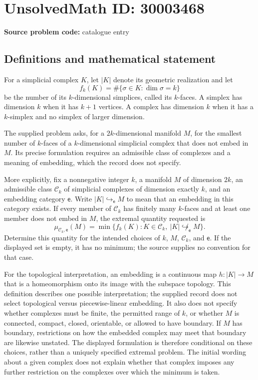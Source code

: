 \documentclass[11pt]{article}
\begin{document}
\section*{UnsolvedMath ID: 30003468}
\textbf{Source problem code:} catalogue entry
\subsection{Definitions and mathematical statement}
For a simplicial complex \(K\), let \(|K|\) denote its geometric realization and let
\[
f_k(K)=\#\{\sigma\in K:\dim\sigma=k\}
\]
be the number of its \(k\)-dimensional simplices, called its \(k\)-faces. A simplex has dimension \(k\) when it has \(k+1\) vertices. A complex has dimension \(k\) when it has a \(k\)-simplex and no simplex of larger dimension.

The supplied problem asks, for a \(2k\)-dimensional manifold \(M\), for the smallest number of \(k\)-faces of a \(k\)-dimensional simplicial complex that does not embed in \(M\). Its precise formulation requires an admissible class of complexes and a meaning of embedding, which the record does not specify.

More explicitly, fix a nonnegative integer \(k\), a manifold \(M\) of dimension \(2k\), an admissible class \(\mathcal C_k\) of simplicial complexes of dimension exactly \(k\), and an embedding category \(\mathsf e\). Write \(|K|\hookrightarrow_{\mathsf e}M\) to mean that an embedding in this category exists. If every member of \(\mathcal C_k\) has finitely many \(k\)-faces and at least one member does not embed in \(M\), the extremal quantity requested is
\[
\mu_{\mathcal C_k,\mathsf e}(M)
=
\min\bigl\{f_k(K):K\in\mathcal C_k,\ |K|\not\hookrightarrow_{\mathsf e}M\bigr\}.
\]
Determine this quantity for the intended choices of \(k\), \(M\), \(\mathcal C_k\), and \(\mathsf e\). If the displayed set is empty, it has no minimum; the source supplies no convention for that case.

For the topological interpretation, an embedding is a continuous map \(h:|K|\to M\) that is a homeomorphism onto its image with the subspace topology. This definition describes one possible interpretation; the supplied record does not select topological versus piecewise-linear embedding. It also does not specify whether complexes must be finite, the permitted range of \(k\), or whether \(M\) is connected, compact, closed, orientable, or allowed to have boundary. If \(M\) has boundary, restrictions on how the embedded complex may meet that boundary are likewise unstated. The displayed formulation is therefore conditional on these choices, rather than a uniquely specified extremal problem. The initial wording about a given complex does not explain whether that complex imposes any further restriction on the complexes over which the minimum is taken.
\end{document}
